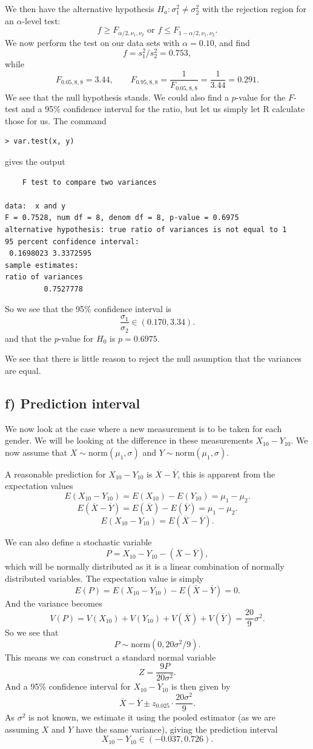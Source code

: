 \documentclass[a4paper, 11pt, titlepage]{article}
\begin{document}
We then have the alternative hypothesis $H_a: \sigma_1^2 \neq \sigma_2^2$ with the rejection region for an $\alpha$-level test:
$$f \geq F_{\alpha/2,\nu_1,\nu_2} \mbox{  or  } f \leq F_{1-\alpha/2,\nu_1,\nu_2}.$$
We now perform the test on our data sets with $\alpha=0.10$, and find
$$f = s_1^2/s_2^2 = 0.753,$$
while
$$F_{0.05, 8, 8} = 3.44, \qquad F_{0.95, 8, 8} = \frac{1}{F_{0.05, 8, 8}} = \frac{1}{3.44} = 0.291.$$
We see that the null hypothesis stands. We could also find a $p$-value for the $F$-test and a 95\% confidence interval for the ratio, but let us simply let R calculate those for us. The command
\begin{lstlisting}
> var.test(x, y)
\end{lstlisting}
gives the output
\begin{lstlisting}
	F test to compare two variances

data:  x and y
F = 0.7528, num df = 8, denom df = 8, p-value = 0.6975
alternative hypothesis: true ratio of variances is not equal to 1
95 percent confidence interval:
 0.1698023 3.3372595
sample estimates:
ratio of variances 
         0.7527778 
\end{lstlisting}
So we see that the 95\% confidence interval is
$$\frac{\sigma_1}{\sigma_2} \in (0.170, 3.34).$$
and that the $p$-value for $H_0$ is $p=0.6975$.

We see that there is little reason to reject the null asumption that the variances are equal.

\subsection*{f) Prediction interval}

We now look at the case where a new measurement is to be taken for each gender. We will be looking at the difference in these measurements $X_{10} - Y_{10}$. We now assume that $X\sim \mbox{norm}(\mu_1, \sigma)$ and $Y\sim \mbox{norm}(\mu_1, \sigma)$.

A reasonable prediction for $X_{10} - Y_{10}$ is $\overline{X} - \overline{Y}$, this is apparent from the expectation values
$$E(X_{10} - Y_{10}) = E(X_{10}) - E(Y_{10}) = \mu_1 - \mu_2.$$
$$E(\overline{X} - \overline{Y}) = E(\overline{X}) - E(\overline{Y}) = \mu_1 - \mu_2.$$
$$E(X_{10} - Y_{10}) = E(\overline{X} - \overline{Y}).$$

We can also define a stochastic variable
$$P = X_{10} - Y_{10} - (\overline{X} - \overline{Y}),$$
which will be normally distributed as it is a linear combination of normally distributed variables. The expectation value is simply
$$E(P) = E(X_{10} - Y_{10}) - E(\overline{X} - \overline{Y}) = 0.$$
And the variance becomes
$$V(P) = V(X_{10}) + V(Y_{10}) + V(\overline{X}) + V(\overline{Y}) = \frac{20}{9}\sigma^2.$$
So we see that
$$P \sim \mbox{norm}(0, 20\sigma^2/9).$$
This means we can construct a standard normal variable
$$Z = \frac{9P}{20\sigma^2}.$$
And a 95\% confidence interval for $X_{10} - Y_{10}$ is then given by
$$\overline{X}-\overline{Y} \pm z_{0.025}\cdot \frac{20\sigma^2}{9}.$$
As $\sigma^2$ is not known, we estimate it using the pooled estimator (as we are assuming $X$ and $Y$ have the same variance), giving the prediction interval
$$X_{10} - Y_{10} \in (-0.037, 0.726).$$
\end{document}
